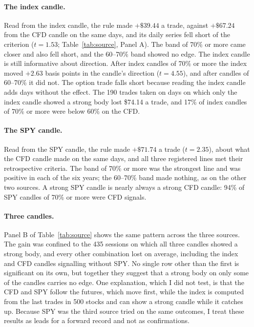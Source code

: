 \documentclass[12pt,letterpaper]{article}
\begin{document}
\paragraph{The index candle.} Read from the index candle, the rule made
$+\$39.44$ a trade, against $+\$67.24$ from the CFD candle on the same days, and
its daily series fell short of the criterion ($t = 1.53$; Table~\ref{tab:source},
Panel A). The band of 70\% or more came closer and also fell short, and the
60--70\% band showed no edge. The index candle is still informative about direction. After index candles of
70\% or more the index moved $+2.63$ basis points in the candle's direction ($t
= 4.55$), and after candles of 60--70\% it did not. The option trade falls
short because reading the index candle adds days without the effect. The 190 trades taken on days on which only the index candle showed a
strong body lost \$74.14 a trade, and 17\% of index candles of 70\% or more were
below 60\% on the CFD.

\paragraph{The SPY candle.} Read from the SPY candle, the rule made $+\$71.74$ a
trade ($t = 2.35$), about what the CFD candle made on the same days, and all three
registered lines met their retrospective criteria. The band of 70\% or more was
the strongest line and was positive in each of the six years; the 60--70\% band
made nothing, as on the other two sources. A strong SPY candle is nearly always a
strong CFD candle: 94\% of SPY candles of 70\% or more were CFD signals.

\paragraph{Three candles.} Panel B of Table~\ref{tab:source} shows the same
pattern across the three sources. The gain was confined to the 435 sessions on
which all three candles showed a strong body, and every other combination lost on
average, including the index and CFD candles signalling without SPY. No single
row other than the first is significant on its own, but together they suggest that a strong body on only some of the candles
carries no edge. One explanation, which I did not test, is that the CFD and SPY follow the futures, which move first,
while the index is computed from the last trades in 500 stocks and can show a
strong candle while it catches up. Because SPY was the third source tried on the
same outcomes, I treat these results as leads for a forward record and not as confirmations.
\end{document}

